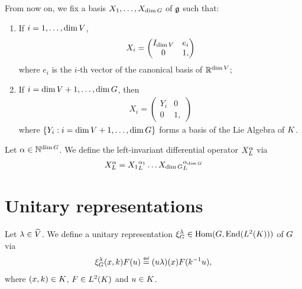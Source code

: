 From now on, we fix a basis $X_1, \dots, X_{\dim G}$ of $\mathfrak{g}$ such that:
\begin{enumerate}
    \item If $i = 1, \dots, \dim V$,
        \begin{align*}
            X_i =
                \begin{pmatrix}
                    {I_{\dim V}} & e_i\\
                    0 & 1,
                \end{pmatrix}
        \end{align*}
        where $e_i$ is the $i$-th vector of the canonical basis of $\mathbb{R}^{\dim V}$;
    \item If $i = \dim V + 1, \dots, \dim G$, then
        \begin{align}
            X_i =
                \begin{pmatrix}
                    Y_i & 0\\
                    0 & 1,
                \end{pmatrix}
                \label{eq:Lie_algebra_vector_coming_from_compact_group}
        \end{align}
        where $\{Y_i : i = \dim V + 1, \dots, \dim G\}$ forms a basis of the Lie Algebra of $K$.
\end{enumerate}

\begin{definition}
    Let $\alpha \in \mathbb{N}^{\dim G}$.
    We define the left-invariant differential operator $X^{\alpha}_L$ via
    \begin{align*}
        X^{\alpha}_L =
        {X_1}_L^{\alpha_1} \dots
        {X_{\dim G}}_L^{\alpha_{\dim G}}
    \end{align*}
\end{definition}

\section{Unitary representations}

\begin{definition}
\label{definition:reducible_representation}
    Let $\lambda \in {\widehat{V}}$.
    We define a unitary representation $\xi^{\lambda}_G \in \operatorname{Hom}(G, \operatorname{End}({L^{2} (K)}))$ of $G$ via
    \begin{align}
        \Rep{\lambda} (x, k) F(u) \defeq (u \lambda)(x) F(k^{-1} u),
    \end{align}
    where $(x, k) \in K$, $F \in {L^{2} (K)}$ and $u \in K$.
\end{definition}


